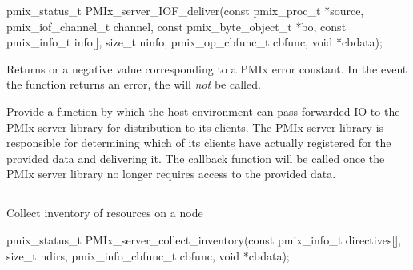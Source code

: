 \format

\cspecificstart
\begin{codepar}
pmix_status_t
PMIx_server_IOF_deliver(const pmix_proc_t *source,
                        pmix_iof_channel_t channel,
                        const pmix_byte_object_t *bo,
                        const pmix_info_t info[], size_t ninfo,
                        pmix_op_cbfunc_t cbfunc, void *cbdata);
\end{codepar}
\cspecificend

\begin{arglist}
\end{arglist}

Returns  or a negative value corresponding to a PMIx error constant. In the event the function returns an error, the  will \textit{not} be called.

\descr

Provide a function by which the host environment can pass forwarded \ac{IO} to the \ac{PMIx} server library for distribution to its clients. The \ac{PMIx} server library is responsible for determining which of its clients have actually registered for the provided data and delivering it. The  callback function will be called once the \ac{PMIx} server library no longer requires access to the provided data.

\subsection{}

\summary

Collect inventory of resources on a node

\format

\cspecificstart
\begin{codepar}
pmix_status_t
PMIx_server_collect_inventory(const pmix_info_t directives[],
                              size_t ndirs,
                              pmix_info_cbfunc_t cbfunc,
                              void *cbdata);
\end{codepar}
\cspecificend

